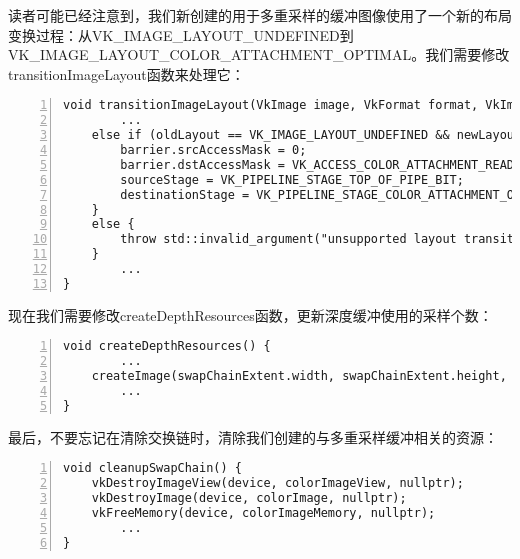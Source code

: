 \documentclass{ctexart}
\begin{document}
读者可能已经注意到，我们新创建的用于多重采样的缓冲图像使用了一个新的布局变换过程：从VK\_IMAGE\_LAYOUT\_UNDEFINED到VK\_IMAGE\_LAYOUT\_COLOR\_ATTACHMENT\_OPTIMAL。我们需要修改transitionImageLayout函数来处理它：

\begin{lstlisting}[language={[ANSI]C},keywordstyle=\color{blue!70},commentstyle=\color{red!50!green!50!blue!50},frame=shadowbox, rulesepcolor=\color{red!20!green!20!blue!20},basicstyle=\small,numbers=left, numberstyle=\tiny,breaklines=true]
void transitionImageLayout(VkImage image, VkFormat format, VkImageLayout oldLayout, VkImageLayout newLayout, uint32_t mipLevels) {
		...
	else if (oldLayout == VK_IMAGE_LAYOUT_UNDEFINED && newLayout == VK_IMAGE_LAYOUT_COLOR_ATTACHMENT_OPTIMAL) {
		barrier.srcAccessMask = 0;
		barrier.dstAccessMask = VK_ACCESS_COLOR_ATTACHMENT_READ_BIT | VK_ACCESS_COLOR_ATTACHMENT_WRITE_BIT;
		sourceStage = VK_PIPELINE_STAGE_TOP_OF_PIPE_BIT;
		destinationStage = VK_PIPELINE_STAGE_COLOR_ATTACHMENT_OUTPUT_BIT;
	}
	else {
		throw std::invalid_argument("unsupported layout transition!");
	}
		...
}
\end{lstlisting}

现在我们需要修改createDepthResources函数，更新深度缓冲使用的采样个数：

\begin{lstlisting}[language={[ANSI]C},keywordstyle=\color{blue!70},commentstyle=\color{red!50!green!50!blue!50},frame=shadowbox, rulesepcolor=\color{red!20!green!20!blue!20},basicstyle=\small,numbers=left, numberstyle=\tiny,breaklines=true]
void createDepthResources() {
		...
	createImage(swapChainExtent.width, swapChainExtent.height, 1, msaaSamples, depthFormat, VK_IMAGE_TILING_OPTIMAL, VK_IMAGE_USAGE_DEPTH_STENCIL_ATTACHMENT_BIT, VK_MEMORY_PROPERTY_DEVICE_LOCAL_BIT, depthImage, depthImageMemory);
		...
}
\end{lstlisting}

最后，不要忘记在清除交换链时，清除我们创建的与多重采样缓冲相关的资源：

\begin{lstlisting}[language={[ANSI]C},keywordstyle=\color{blue!70},commentstyle=\color{red!50!green!50!blue!50},frame=shadowbox, rulesepcolor=\color{red!20!green!20!blue!20},basicstyle=\small,numbers=left, numberstyle=\tiny,breaklines=true]
void cleanupSwapChain() {
	vkDestroyImageView(device, colorImageView, nullptr);
	vkDestroyImage(device, colorImage, nullptr);
	vkFreeMemory(device, colorImageMemory, nullptr);
		...
}
\end{lstlisting}
\end{document}
